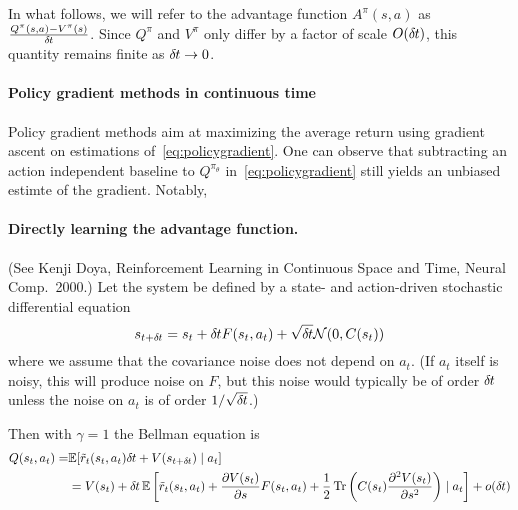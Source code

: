 In what follows, we will refer to the advantage function $A^\pi(s, a)$ as
$\frac{Q^\pi(s,a) - V^\pi(s)}{\delta\hspace{-.06em}t}$. Since $Q^\pi$ and $V^\pi$ only differ
by a factor of scale $O (\delta\hspace{-.06em}t)$, this quantity remains finite as $\delta\hspace{-.06em}t \to 0$.

\paragraph{Policy gradient methods in continuous time} Policy gradient methods aim at
maximizing the average return using gradient ascent on estimations of~\eqref{eq:policygradient}.
One can observe that subtracting an action independent baseline to $Q^{\pi_\theta}$ in~\eqref{eq:policygradient} still yields an unbiased estimte of the gradient. Notably,
\begin{equation}
\end{equation}


\paragraph{Directly learning the advantage function.}
(See Kenji Doya, Reinforcement Learning in Continuous Space and Time,
Neural Comp.\ 2000.)
Let the system be defined by a state- and action-driven stochastic
differential equation
\begin{equation}
s_{t+\delta\hspace{-.06em}t}=s_t+\delta\hspace{-.06em}t F(s_t,a_t)+\sqrt{\delta\hspace{-.06em}t}\mathcal{N}(0,C(s_t))
\end{equation}
where we assume that the covariance noise does not depend on $a_t$. (If
$a_t$ itself is noisy, this will produce noise on $F$, but this noise
would typically be of order $\delta\hspace{-.06em}t$ unless the noise on $a_t$ is of
order $1/\sqrt{\delta\hspace{-.06em}t}$.)

Then with $\gamma=1$ the Bellman equation is
\begin{align}
Q(s_t,a_t)=&\mathbb{E}[ \tilde{r}_t(s_t,a_t) \delta\hspace{-.06em}t + V(s_{t+\delta\hspace{-.06em}t}) \mid a_t]
\\&=V(s_t)+\delta\hspace{-.06em}t \,\mathbb{E}\left[\tilde{r}_t(s_t,a_t)+\frac{\partial V(s_t)}{\partial
s}F(s_t,a_t)+\frac12 \operatorname{Tr} \left(C(s_t)\frac{\partial^2 V(s_t)}{\partial
s^2}\right)\mid a_t\right]+o(\delta\hspace{-.06em}t)
\end{align}

